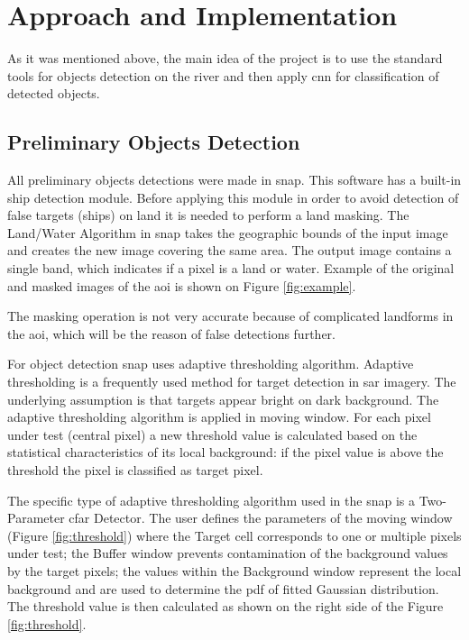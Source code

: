 \section{Approach and Implementation}

As it was mentioned above, the main idea of the project is to use the standard tools for objects detection on the river and then apply \gls{cnn} for classification of detected objects.

\subsection{Preliminary Objects Detection}

All preliminary objects detections were made in \gls{snap}. This software has a built-in ship detection module. Before applying this module in order to avoid detection of false targets (ships) on land it is needed to perform a land masking. The Land/Water Algorithm in \gls{snap} takes the geographic bounds of the input image and creates the new image covering the same area. The output image contains a single band, which indicates if a pixel is a land or water. Example of the original and masked images of the \gls{aoi} is shown on Figure \ref{fig:example}.


The masking operation is not very accurate because of complicated landforms in the \gls{aoi}, which will be the reason of false detections further.

For object detection \gls{snap} uses adaptive thresholding algorithm. Adaptive thresholding is a frequently used method for target detection in \gls{sar} imagery. The underlying assumption is that targets appear bright on dark background. The adaptive thresholding algorithm is applied in moving window. For each pixel under test (central pixel) a new threshold value is calculated based on the statistical characteristics of its local background: if the pixel value is above the threshold the pixel is classified as target pixel.

The specific type of adaptive thresholding algorithm used in the \gls{snap} is a Two-Parameter \gls{cfar} Detector. The user defines the parameters of the moving window (Figure \ref{fig:threshold}) where the Target cell corresponds to one or multiple pixels under test; the Buffer window prevents contamination of the background values by the target pixels; the values within the Background window represent the local background and are used to determine the \gls{pdf} of fitted Gaussian distribution. The threshold value is then calculated as shown on the right side of the Figure \ref{fig:threshold}.


